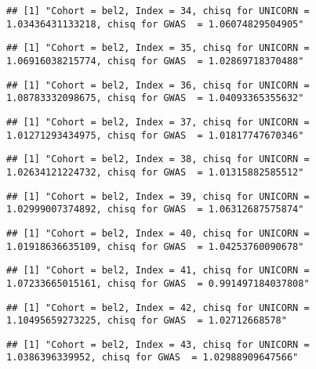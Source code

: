 \documentclass[]{article}
\begin{document}
\begin{verbatim}
## [1] "Cohort = bel2, Index = 34, chisq for UNICORN = 1.03436431133218, chisq for GWAS  = 1.06074829504905"
\end{verbatim}

\begin{verbatim}
## [1] "Cohort = bel2, Index = 35, chisq for UNICORN = 1.06916038215774, chisq for GWAS  = 1.02869718370488"
\end{verbatim}

\begin{verbatim}
## [1] "Cohort = bel2, Index = 36, chisq for UNICORN = 1.08783332098675, chisq for GWAS  = 1.04093365355632"
\end{verbatim}

\begin{verbatim}
## [1] "Cohort = bel2, Index = 37, chisq for UNICORN = 1.01271293434975, chisq for GWAS  = 1.01817747670346"
\end{verbatim}

\begin{verbatim}
## [1] "Cohort = bel2, Index = 38, chisq for UNICORN = 1.02634121224732, chisq for GWAS  = 1.01315882585512"
\end{verbatim}

\begin{verbatim}
## [1] "Cohort = bel2, Index = 39, chisq for UNICORN = 1.02999007374892, chisq for GWAS  = 1.06312687575874"
\end{verbatim}

\begin{verbatim}
## [1] "Cohort = bel2, Index = 40, chisq for UNICORN = 1.01918636635109, chisq for GWAS  = 1.04253760090678"
\end{verbatim}

\begin{verbatim}
## [1] "Cohort = bel2, Index = 41, chisq for UNICORN = 1.07233665015161, chisq for GWAS  = 0.991497184037808"
\end{verbatim}

\begin{verbatim}
## [1] "Cohort = bel2, Index = 42, chisq for UNICORN = 1.10495659273225, chisq for GWAS  = 1.02712668578"
\end{verbatim}

\begin{verbatim}
## [1] "Cohort = bel2, Index = 43, chisq for UNICORN = 1.0386396339952, chisq for GWAS  = 1.02988909647566"
\end{verbatim}
\end{document}
